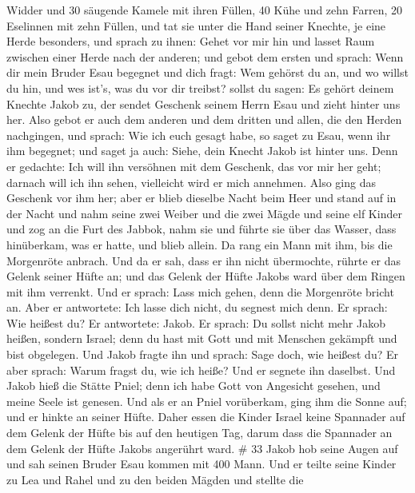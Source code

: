 Widder  und 30 säugende Kamele mit ihren Füllen, 40 Kühe
und zehn Farren, 20 Eselinnen mit zehn Füllen,  und tat sie
unter die Hand seiner Knechte, je eine Herde besonders, und sprach zu
ihnen: Gehet vor mir hin und lasset Raum zwischen einer Herde nach der
anderen;  und gebot dem ersten und sprach: Wenn dir mein
Bruder Esau begegnet und dich fragt: Wem gehörst du an, und wo willst du
hin, und wes ist's, was du vor dir treibst?  sollst du
sagen: Es gehört deinem Knechte Jakob zu, der sendet Geschenk seinem
Herrn Esau und zieht hinter uns her.  Also gebot er auch
dem anderen und dem dritten und allen, die den Herden nachgingen, und
sprach: Wie ich euch gesagt habe, so saget zu Esau, wenn ihr ihm
begegnet;  und saget ja auch: Siehe, dein Knecht Jakob ist
hinter uns. Denn er gedachte: Ich will ihn versöhnen mit dem Geschenk,
das vor mir her geht; darnach will ich ihn sehen, vielleicht wird er
mich annehmen.  Also ging das Geschenk vor ihm her; aber er
blieb dieselbe Nacht beim Heer  und stand auf in der Nacht
und nahm seine zwei Weiber und die zwei Mägde und seine elf Kinder und
zog an die Furt des Jabbok,  nahm sie und führte sie über
das Wasser, dass hinüberkam, was er hatte,  und blieb
allein. Da rang ein Mann mit ihm, bis die Morgenröte anbrach.
 Und da er sah, dass er ihn nicht übermochte, rührte er das
Gelenk seiner Hüfte an; und das Gelenk der Hüfte Jakobs ward über dem
Ringen mit ihm verrenkt.  Und er sprach: Lass mich gehen,
denn die Morgenröte bricht an. Aber er antwortete: Ich lasse dich nicht,
du segnest mich denn.  Er sprach: Wie heißest du? Er
antwortete: Jakob.  Er sprach: Du sollst nicht mehr Jakob
heißen, sondern Israel; denn du hast mit Gott und mit Menschen gekämpft
und bist obgelegen.  Und Jakob fragte ihn und sprach: Sage
doch, wie heißest du? Er aber sprach: Warum fragst du, wie ich heiße?
Und er segnete ihn daselbst.  Und Jakob hieß die Stätte
Pniel; denn ich habe Gott von Angesicht gesehen, und meine Seele ist
genesen.  Und als er an Pniel vorüberkam, ging ihm die
Sonne auf; und er hinkte an seiner Hüfte.  Daher essen die
Kinder Israel keine Spannader auf dem Gelenk der Hüfte bis auf den
heutigen Tag, darum dass die Spannader an dem Gelenk der Hüfte Jakobs
angerührt ward. \# 33  Jakob hob seine Augen auf und sah
seinen Bruder Esau kommen mit 400 Mann. Und er teilte seine Kinder zu
Lea und Rahel und zu den beiden Mägden  und stellte die
